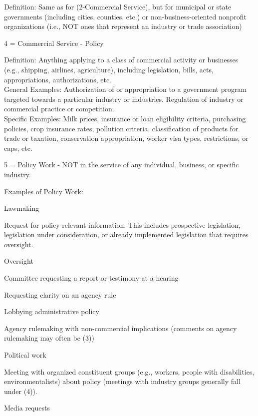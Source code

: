\hfill\begin{minipage}{\dimexpr\textwidth-2cm}
Definition: Same as for (2-Commercial Service), but for municipal or state governments (including cities, counties, etc.) or non-business-oriented nonprofit organizations (i.e., NOT ones that represent an industry or trade association) \\
\end{minipage}

4 = Commercial Service - Policy \\

\hfill\begin{minipage}{\dimexpr\textwidth-2cm}
Definition: Anything applying to a class of commercial activity or businesses (e.g., shipping, airlines, agriculture), including legislation, bills, acts, appropriations, authorizations, etc. \\
General Examples: Authorization of or appropriation to a government program targeted towards a particular industry or industries. Regulation of industry or commercial practice or competition.\\
Specific Examples: Milk prices, insurance or loan eligibility criteria, purchasing policies, crop insurance rates, pollution criteria, classification of products for trade or taxation, conservation appropriation, worker visa types, restrictions, or caps, etc.\\
\end{minipage}
 
5 = Policy Work - NOT in the service of any individual, business, or specific industry.\\

\hfill\begin{minipage}{\dimexpr\textwidth-2cm}
Examples of Policy Work: 
 \begin{tight_itemize} 
 \item Lawmaking 
\item Request for policy-relevant information. This includes prospective legislation, legislation under consideration, or already implemented legislation that requires oversight.  
\item Oversight
\item Committee requesting a report or testimony at a hearing
\item Requesting clarity on an agency rule
\item Lobbying administrative policy
\item Agency rulemaking with non-commercial implications (comments on agency rulemaking may often be (3)) 
\item Political work
\item Meeting with organized constituent groups (e.g., workers, people with disabilities, environmentalists) about policy (meetings with industry groups generally fall under (4)).
\item Media requests
 \end{tight_itemize} 
\end{minipage}
\bigskip


